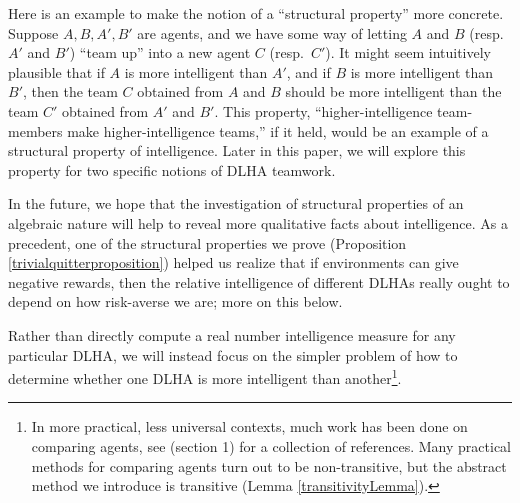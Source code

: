 \documentclass[twoside,11pt]{article}
\begin{document}
Here is an example to make the notion of a ``structural property'' more
concrete. Suppose $A,B,A',B'$ are agents, and we have some way of letting
$A$ and $B$ (resp.~$A'$ and $B'$) ``team up'' into a new agent $C$ (resp.~$C'$).
It might seem intuitively plausible that if $A$ is more
intelligent than $A'$, and if $B$ is more intelligent than $B'$, then the team
$C$ obtained from $A$ and $B$ should be more intelligent than the team $C'$
obtained from $A'$ and $B'$. This property, ``higher-intelligence team-members
make higher-intelligence teams,'' if it held, would be an example of a structural property
of intelligence. Later in this paper, we will explore this property for
two specific notions of DLHA teamwork.

In the future, we hope that the investigation of structural properties of an
algebraic nature will help to reveal more qualitative facts about intelligence.
As a precedent, one of the structural properties we prove (Proposition
\ref{trivialquitterproposition}) helped us realize that if environments can
give negative rewards, then the relative intelligence of different DLHAs
really ought to depend on how risk-averse we are; more on this below.

Rather than directly compute a real number intelligence measure for any
particular DLHA, we will instead focus on the simpler problem of
how to determine whether one DLHA is more intelligent
than another\footnote{In more practical, less universal contexts, much work has
been done on comparing agents, see \cite{balduzzi} (section 1) for a collection
of references. Many practical methods for comparing agents turn out to be non-transitive,
but the abstract method we introduce is transitive (Lemma \ref{transitivityLemma}).}.
\end{document}
